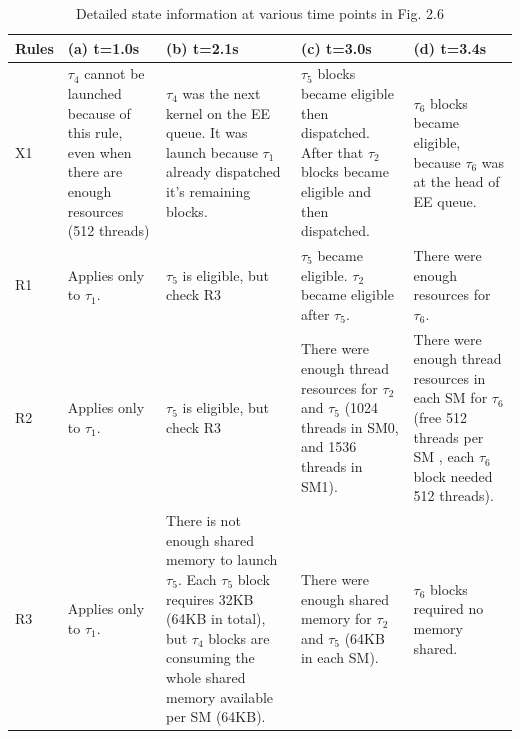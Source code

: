 \documentclass[
  12pt,
  a4paperpaper,
]{report}
\begin{document}
\begin{table}[hbtp]
    \small
\begin{tabularx}{\linewidth}{|X|X|X|X|X|}
    \hline
Rules & (a) t=1.0s & (b) t=2.1s & (c) t=3.0s & (d) t=3.4s \\ \hline
X1 & \(\tau_4\) cannot be launched because of this rule, even when there are enough resources (512 threads) & \(\tau_4\) was the next kernel on the EE queue. It was launch because \(\tau_1\) already dispatched it's remaining blocks. & \(\tau_5\) blocks became eligible then dispatched. After that \(\tau_2\) blocks became eligible and then dispatched. & \(\tau_6\) blocks became eligible, because \(\tau_6\) was at the head of EE queue. \\ \hline
R1 & Applies only to \(\tau_1\). & \(\tau_5\) is eligible, but check R3 & \(\tau_5\) became eligible. \(\tau_2\) became eligible after \(\tau_5\). & There were enough resources for \(\tau_6\). \\ \hline
R2 & Applies only to \(\tau_1\). & \(\tau_5\) is eligible, but check R3 & There were enough thread resources for \(\tau_2\) and \(\tau_5\) (1024 threads in SM0, and 1536 threads in SM1). & There were enough thread resources in each SM for \(\tau_6\) (free 512 threads per SM , each \(\tau_6\) block needed 512 threads). \\ \hline
R3 & Applies only to \(\tau_1\). & There is not enough shared memory to launch \(\tau_5\).  Each \(\tau_5\) block requires 32KB (64KB in total), but \(\tau_4\) blocks are consuming the whole shared memory available per SM (64KB). & There were enough shared memory for \(\tau_2\) and \(\tau_5\) (64KB in each SM). & \(\tau_6\) blocks required no memory shared.  \\ \hline
\end{tabularx}
\label{tab:scheduler_rules2}
\caption{Detailed state information at various time points in Fig. 2.6}
\end{table}
\end{document}
